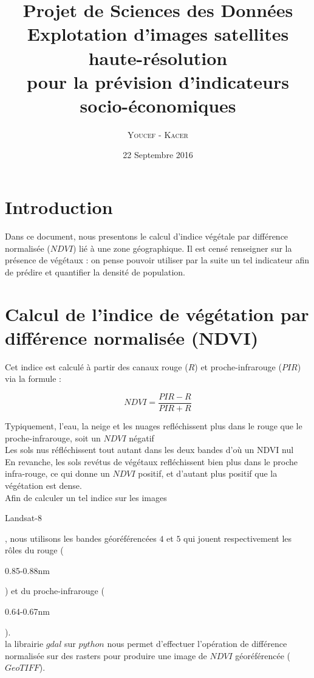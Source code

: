 \documentclass{book}
\title{%
  Projet de Sciences des Données \\
  \large Explotation d'images satellites haute-résolution \\pour la prévision d'indicateurs socio-économiques \\
    }
\author{\textsc{Youcef} - \textsc{Kacer}}
\date{22 Septembre 2016}
\begin{document}
 
\maketitle

\tableofcontents

\frontmatter
\chapter{Introduction}
Dans ce document, nous presentons le calcul d'indice végétale par différence normalisée ($NDVI$) lié à une zone géographique. Il est censé renseigner sur la présence de végétaux :
on pense pouvoir utiliser par la suite un tel indicateur afin de prédire et quantifier la densité de population. 

\mainmatter
\chapter{Calcul de l'indice de végétation par différence normalisée (NDVI)}

Cet indice est calculé à partir des canaux
rouge ($R$) et proche-infrarouge ($PIR$) via la formule : 

\[NDVI=\frac{PIR-R}{PIR+R}\]

Typiquement, l'eau, la neige et les nuages refléchissent plus dans le rouge que le proche-infrarouge, soit un $NDVI$ négatif\\
Les sols nus réfléchissent tout autant dans les deux bandes d'où un NDVI nul\\
En revanche, les sols revétus de végétaux refléchissent bien plus dans le proche infra-rouge, ce qui donne un $NDVI$ positif, et d'autant
plus positif que la végétation est dense.\\
Afin de calculer un tel indice sur les images \begin{itshape}Landsat-8\end{itshape}, nous utilisons les bandes géoréférencées $4$ et $5$ 
qui jouent respectivement les r\^oles du rouge (\begin{itshape}0.85-0.88nm\end{itshape}) et du proche-infrarouge (\begin{itshape}0.64-0.67nm\end{itshape}).\\
la librairie $gdal$ sur $python$ nous permet d'effectuer l'opération de différence normalisée sur des rasters pour produire une image de $NDVI$ géoréférencée ($GeoTIFF$).
\end{document}
